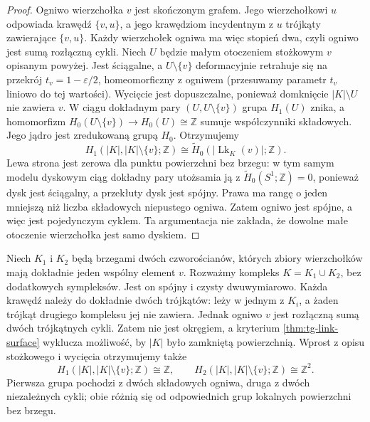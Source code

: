 \begin{proof}
Ogniwo wierzchołka $v$ jest skończonym grafem.
Jego wierzchołkowi $u$ odpowiada krawędź $\{v,u\}$,
a jego krawędziom incydentnym z $u$ trójkąty zawierające
$\{v,u\}$. Każdy wierzchołek ogniwa ma więc stopień dwa,
czyli ogniwo jest sumą rozłączną cykli. Niech $U$ będzie
małym otoczeniem stożkowym $v$ opisanym powyżej.
Jest ściągalne, a $U\setminus\{v\}$ deformacyjnie
retrahuje się na przekrój $t_v=1-\varepsilon/2$,
homeomorficzny z ogniwem (przesuwamy parametr $t_v$
liniowo do tej wartości). Wycięcie jest dopuszczalne,
ponieważ domknięcie $|K|\setminus U$ nie zawiera $v$.
W ciągu dokładnym pary $(U,U\setminus\{v\})$ grupa
$H_1(U)$ znika, a homomorfizm
$H_0(U\setminus\{v\})\to H_0(U)\cong\mathbb Z$
sumuje współczynniki składowych. Jego jądro jest
zredukowaną grupą $H_0$. Otrzymujemy
\[
 H_1(|K|,|K|\setminus\{v\};\mathbb Z)
 \cong \widetilde H_0(|\operatorname{Lk}_K(v)|;\mathbb Z).
\]
Lewa strona jest zerowa dla punktu powierzchni bez brzegu:
w tym samym modelu dyskowym ciąg dokładny pary
utożsamia ją z $\widetilde H_0(S^1;\mathbb Z)=0$,
ponieważ dysk jest ściągalny, a przekłuty dysk
jest spójny.
Prawa ma rangę o jeden mniejszą niż liczba składowych
niepustego ogniwa. Zatem ogniwo jest spójne, a więc
jest pojedynczym cyklem. Ta argumentacja nie zakłada,
że dowolne małe otoczenie wierzchołka jest samo dyskiem.
\end{proof}

\begin{przyklad}
\label{ex:tg-pinched-spheres}
Niech $K_1$ i $K_2$ będą brzegami dwóch czworościanów,
których zbiory wierzchołków mają dokładnie jeden
wspólny element $v$. Rozważmy kompleks
$K=K_1\cup K_2$, bez dodatkowych sympleksów.
Jest on spójny i czysty dwuwymiarowo.
Każda krawędź należy do dokładnie dwóch trójkątów:
leży w jednym z $K_i$, a żaden trójkąt drugiego
kompleksu jej nie zawiera.
Jednak ogniwo $v$ jest rozłączną sumą dwóch
trójkątnych cykli. Zatem nie jest okręgiem,
a kryterium \ref{thm:tg-link-surface} wyklucza
możliwość, by $|K|$ było zamkniętą powierzchnią.
Wprost z opisu stożkowego i wycięcia otrzymujemy
także
\[
H_1(|K|,|K|\setminus\{v\};\mathbb Z)\cong\mathbb Z,
\qquad
H_2(|K|,|K|\setminus\{v\};\mathbb Z)\cong\mathbb Z^2.
\]
Pierwsza grupa pochodzi z dwóch składowych ogniwa,
druga z dwóch niezależnych cykli; obie różnią się
od odpowiednich grup lokalnych powierzchni bez brzegu.
\end{przyklad}

